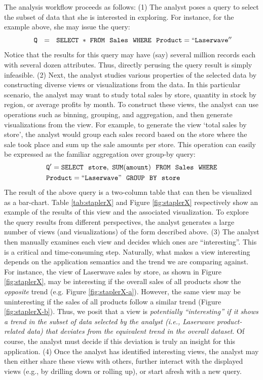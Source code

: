 The analysis workflow proceeds as follows:
(1) The analyst poses a query to select the subset of data that she is
interested in exploring.
For instance, for the example above, she may issue the query:
\noindent $${\tt \ Q \ \ = \ \ SELECT \ * \ FROM \ \  Sales \ \ WHERE \ \
Product=``Laserwave''} $$ \noindent Notice that the results for this query may
have (say) several million records each with several dozen attributes.
Thus, directly perusing the query result is simply infeasible.
(2) Next, the analyst studies various properties of the selected data by
constructing diverse views or visualizations from the data. In this particular
scenario, the analyst may want to study total sales by store, quantity in stock
by region, or average profits by month. To construct these views, the analyst
can use operations such as binning, grouping, and aggregation, and then generate
visualizations from the view. For example, to generate the view `total sales by
store', the analyst would group each sales record based on the store where the
sale took place and sum up the sale amounts per store. This operation can easily
be expressed as the familiar aggregation over group-by query:
\noindent
\begin{align*}
& \tt Q' = SELECT \ \ store,\ SUM(amount) \ \ FROM \ \  Sales \ \ WHERE \\
& \tt Product=``Laserwave" \ \ GROUP  \ \ BY \ \ store
\end{align*}
The result of the above query is a two-column table that can then be visualized
as a bar-chart. Table \ref{tab:staplerX} and Figure
\ref{fig:staplerX} respectively show an example of the results of this view and
the associated visualization.
To explore the query results from different perspectives, the analyst generates
a large number of views (and visualizations) of the form described above.
(3) The analyst then manually examines each view and decides
which ones are ``interesting''. This is a critical and time-consuming step.
Naturally, what makes a view interesting depends on the 
application semantics and the trend we are comparing against.
For instance, the view of Laserwave sales by store, as shown in Figure
\ref{fig:staplerX}, may be interesting if the overall sales of all products show
the {\it opposite} trend (e.g. Figure \ref{fig:staplerX-a}). However, the same
view may be uninteresting if the sales of all products follow a similar trend (Figure \ref{fig:staplerX-b}).
Thus, we posit that  a view is {\em potentially ``interesting'' if it shows 
a trend in the subset of data selected by the analyst
(i.e., Laserwave product-related data)
that deviates from the equivalent trend in the overall dataset}.
Of course, the analyst must decide if this deviation 
is truly an insight for this application.
(4) Once the analyst has identified interesting views, the analyst may
then either share these views with others, further interact with
the displayed views (e.g., by drilling down or rolling up), or
start afresh with a new query.


